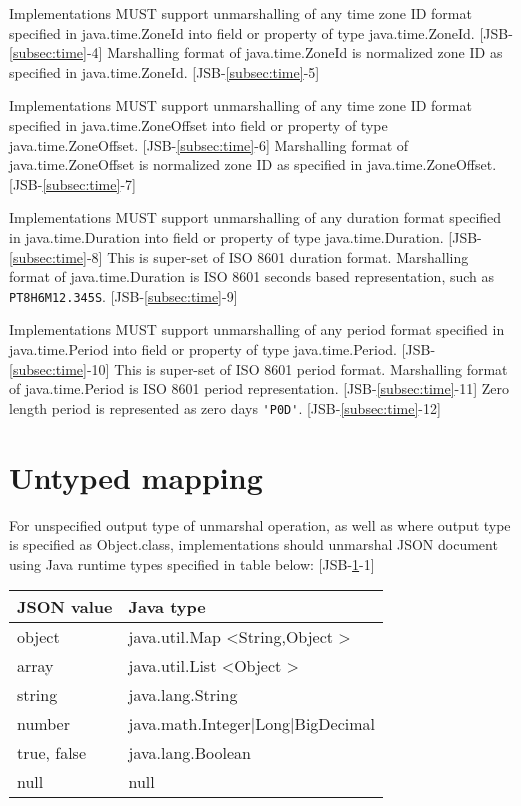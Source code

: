 Implementations MUST support unmarshalling of any time zone ID format specified in java.time.ZoneId into field or property of type java.time.ZoneId. [JSB-\ref{subsec:time}-4]
Marshalling format of java.time.ZoneId is normalized zone ID as specified in java.time.ZoneId. [JSB-\ref{subsec:time}-5]

Implementations MUST support unmarshalling of any time zone ID format specified in java.time.ZoneOffset into field or property of type java.time.ZoneOffset. [JSB-\ref{subsec:time}-6]
Marshalling format of java.time.ZoneOffset is normalized zone ID as specified in java.time.ZoneOffset. [JSB-\ref{subsec:time}-7]

Implementations MUST support unmarshalling of any duration format specified in java.time.Duration into field or property of type java.time.Duration. [JSB-\ref{subsec:time}-8] This is super-set of ISO 8601 duration format.
Marshalling format of java.time.Duration is ISO 8601 seconds based representation, such as
\verb|PT8H6M12.345S|. [JSB-\ref{subsec:time}-9]

Implementations MUST support unmarshalling of any period format specified in java.time.Period into field or property of type java.time.Period. [JSB-\ref{subsec:time}-10] This is super-set of ISO 8601 period format.
Marshalling format of java.time.Period is ISO 8601 period representation. [JSB-\ref{subsec:time}-11] Zero length period is represented as zero days \verb|'P0D'|. [JSB-\ref{subsec:time}-12]


\section{Untyped mapping}
\label{sec:untyped}
For unspecified output type of unmarshal operation, as well as where output type is specified as Object.class, implementations should unmarshal JSON document using Java runtime types specified in table below: [JSB-\ref{sec:untyped}-1]

\begin{tabularx}{\textwidth}{ |X|X| }
\hline
JSON value & Java type \\ 
\hline
object & java.util.Map \textless String,Object \textgreater\\
array & java.util.List \textless Object \textgreater \\
string & java.lang.String \\
number & java.math.Integer|Long|BigDecimal \\
true, false & java.lang.Boolean \\
null & null \\
\hline
\end{tabularx}

